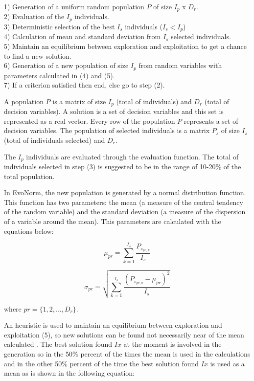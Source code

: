 \documentclass{sig-alternate-05-2015}
\begin{document}
\begin{mdframed}[frametitle={General procedure for EvoNorm:}]
1) Generation of a uniform random population $P$ of size $I_p$ x $D_r$.\\
2) Evaluation of the $I_p$ individuals.\\
3) Deterministic selection of the best $I_s$ individuals ($I_s<I_p$)\\
4) Calculation of mean and standard deviation from $I_s$ selected individuals.\\
5) Maintain an equilibrium between exploration and exploitation to get a chance to find a new solution.\\
6) Generation of a new population of size $I_p$ from random variables with parameters calculated in (4) and (5).\\
7) If a criterion satisfied then end, else go to step (2).\\
\end{mdframed}

A population $P$ is a matrix of size $I_p$ (total of individuals) and $D_r$ (total of decision variables). A solution is a set of decision variables and this set is represented as a real vector. Every row of the population $P$ represents a set of decision variables. The population of selected individuals is a matrix $P_s$ of size $I_s$ (total of individuals selected) and $D_r$.

The $I_p$ individuals are evaluated through the evaluation function. The total of individuals selected in step (3) is suggested to be in the range of 10-20\% of the total population.

In EvoNorm, the new population is generated by a normal distribution function. This function has two parameters: the mean (a measure of the central tendency of the random variable) and the standard deviation (a measure of the dispersion of a variable around the mean). This parameters are calculated with the equations below:

\begin{equation}
\mu_{pr}=\sum^{I_s}_{k=1}\frac{P_{s_{pr,k}}}{I_s}
\end{equation}

\begin{equation}
\sigma_{pr}=\sqrt{\sum^{I_s}_{k=1}\frac{(P_{s_{pr,k}}-\mu_{pr})^2}{I_s}}
\end{equation}

where $pr=\{1,2,...,D_r\}$.

An heuristic is used to maintain an equilibrium between exploration and exploitation (5), so new solutions can be found not necessarily near of the mean calculated \cite{torres:evonorm3}. The best solution found $Ix$ at the moment is involved in the generation so in the 50\% percent of the times the mean is used in the calculations and in the other 50\% percent of the time the best solution found $Ix$ is used as a mean as is shown in the following equation:
\end{document}
